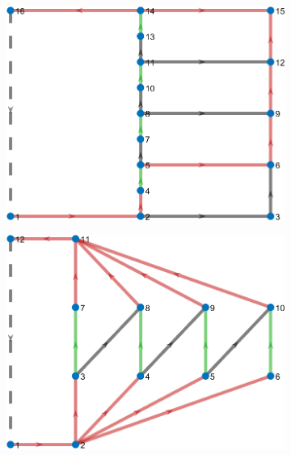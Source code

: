 \documentclass{article}
\begin{document}
\begin{figure}[htbp]
    \centering
    \begin{subfigure}[b]{0.45\textwidth}
        \includegraphics[width=\textwidth]{../attachments/e-dege-mac-4.png}
        \caption{}
        \label{fig:d-structure-f4}
    \end{subfigure}
    \hspace{0.05\textwidth}
    \begin{subfigure}[b]{0.45\textwidth}
        \includegraphics[width=\textwidth]{../attachments/f-dege-mac-4.png}
        \caption{}
        \label{fig:d-structure-e4}
    \end{subfigure}
    \hspace{0.05\textwidth}

\end{figure}
\end{document}
